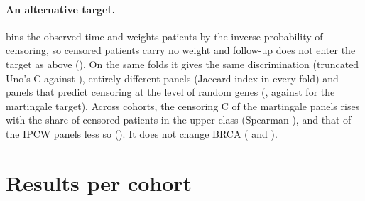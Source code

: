 \paragraph{An alternative target.}  bins the observed time and weights patients by the inverse probability of
censoring, so censored patients carry no weight and follow-up does not enter the target
as above (). On the same folds it gives the same
discrimination (truncated Uno's C \SuppIpcwC{} against \SuppMartC), entirely different
panels (Jaccard index \SuppIpcwJaccardMax{} in every fold) and panels that predict censoring
at the level of random genes (\SuppIpcwCens, against \SuppMartCens{} for the martingale
target). Across cohorts, the censoring C of the martingale panels rises with the share of
censored patients in the upper class (Spearman \SuppGradMart), and that of the IPCW panels
less so (\SuppGradIpcw). It does not change BRCA (\SuppBrcaMartCens{} and
\SuppBrcaIpcwCens).

\begin{table}[htbp]
\centering\footnotesize
\caption{Cox model on censoring. Each ten-gene panel is selected on the true outcome over
the protein-coding features, and the ridge Cox model is trained and scored with censoring as
the event, on the folds of the matched panel size analysis. Harrell's C over the eleven
TCGA cohorts: mean, minimum and maximum. Percentile: mean over cohorts of the panel's
percentile among the 100 random ten-gene panels of its cohort. Above 95th: cohorts in which
the panel exceeds the 95th percentile. METABRIC: the same percentile in METABRIC. Null fits:
folds, out of 55 per panel (5,500 for the random panels), in which the model fell back to
the null model. n.r., not run.}
\label{S-tab:censoring}

\end{table}

\begin{table}[htbp]
\centering\footnotesize
\caption{Composition of the upper class of the $q = 2$ target, computed on each whole
TCGA cohort. Censored: censored patients in the upper class, as a count and as a share of
the class. Follow-up, in days: median follow-up of the censored patients in the upper and
in the lower class, and median follow-up of the cohort by reverse Kaplan-Meier
(\SuppFollowMin{} to \SuppFollowMax{} days).}
\label{S-tab:target}

\end{table}

\section{Results per cohort}\label{S-sec:percohort}

